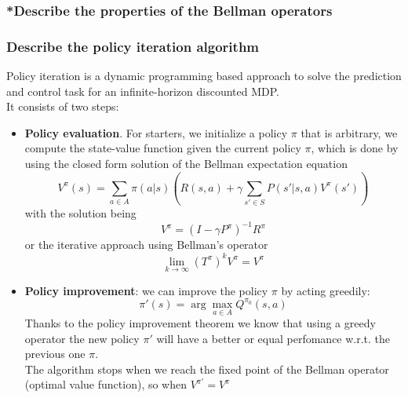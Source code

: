 \subsubsection{*Describe the properties of the Bellman operators}

\subsubsection{Describe the policy iteration algorithm}
    Policy iteration is a dynamic programming based approach to solve the prediction and control task for an infinite-horizon discounted MDP.\\
    It consists of two steps:
    \begin{itemize}
        \item \textbf{Policy evaluation}. For starters, we initialize a policy $\pi$ that is arbitrary, we compute the state-value function given the current policy $\pi$, which is done by using the closed form solution of the Bellman expectation equation
        $$
        V^\pi (s) = \sum _{a \in A} \pi (a|s) \left(R(s,a) + \gamma \sum _{s' \in S} P(s'| s, a) V^\pi(s')\right)
        $$
        with the solution being
        $$
        V^\pi = (I-\gamma P^\pi)^{-1}R^\pi
        $$    
        or the iterative approach using Bellman's operator
        $$
        \lim _{k \rightarrow \infty} (T^\pi)^kV^\pi = V^\pi 
        $$
        \item \textbf{Policy improvement}: we can improve the policy $\pi$ by acting greedily:
        $$
        \pi'(s) = \arg\max_{a \in A}Q^{\pi_{0}} (s, a)
        $$
        Thanks to the policy improvement theorem we know that using a greedy operator the new policy $\pi'$ will have a better or equal perfomance w.r.t. the previous one $\pi$.\\
        The algorithm stops when we reach the fixed point of the Bellman operator (optimal value function), so when $V^{\pi'} = V^{\pi}$
    \end{itemize}

